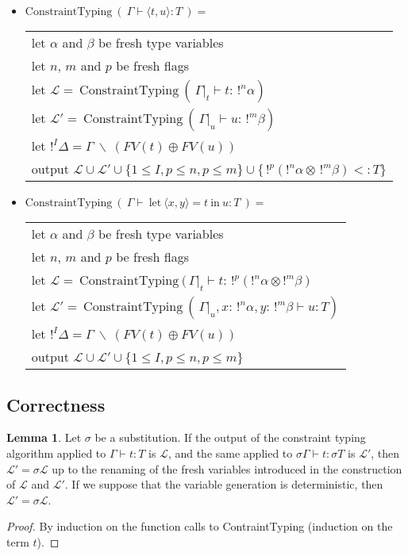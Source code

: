 \documentclass[10pt]{article}
\theoremstyle{plain}
\theoremstyle{definition}
\newtheorem{lemma}{Lemma}[section]
\newcommand{\pair}[2]{\langle #1, #2 \rangle}
\begin{document}
\begin{itemize}
		\item $\text{ConstraintTyping} ~ (~ \Gamma \vdash \pair{t}{u} : T ~) = $ \\
			\begin{tabular}{l}
				let $\alpha$ and $\beta$ be fresh type variables \\
				let $n$, $m$ and $p$ be fresh flags \\
				let $\mathcal{L} = ~ \text{ConstraintTyping} ~ ( \, \Gamma|_t \vdash t : \, !^n\alpha)$ \\
				let $\mathcal{L'} = ~ \text{ConstraintTyping} ~ ( \, \Gamma|_u \vdash u : \, !^m\beta)$ \\
				let $!^I\Delta = \Gamma ~ \backslash ~ (FV(t) \oplus FV(u))$ \\
				output $\mathcal{L \cup L'} \cup \{ 1 \le I, p \le n, p \le m \} \cup \{ \, !^p (!^n \alpha \otimes \, !^m \beta) <: T\}$
			\end{tabular}
			
		\item $\text{ConstraintTyping} ~ (~ \Gamma \vdash ~\text{let}~ \pair{x}{y} = t ~\text{in}~ u : T ~) = $ \\
			\begin{tabular}{l}
				let $\alpha$ and $\beta$ be fresh type variables \\
				let $n$, $m$ and $p$ be fresh flags \\
				let $\mathcal{L} = ~ \text{ConstraintTyping} ~ ( \, \Gamma|_t \vdash t : \, !^p(!^n \alpha \otimes !^m \beta)$ \\
				let $\mathcal{L'} = ~ \text{ConstraintTyping} ~ ( \, \Gamma|_u, x : \,!^n \alpha, y : \,!^m \beta \vdash u : T)$ \\
				let $!^I\Delta = \Gamma ~ \backslash ~ (FV(t) \oplus FV(u))$ \\
				output $\mathcal{L \cup L'} \cup \{ 1 \le I, p \le n, p \le m \}$
			\end{tabular}
	\end{itemize}
	
\subsection{Correctness}

\begin{lemma}
	\label{tau-context}
	Let $\sigma$ be a substitution. If the output of the constraint typing algorithm applied to $\Gamma \vdash t : T$ is $\mathcal{L}$,
	and the same applied to $\sigma \Gamma \vdash t : \sigma T$ is $\mathcal{L'}$,
	then $\mathcal{L'} = \sigma \mathcal{L}$ up to the renaming of the fresh variables introduced in the construction of $\mathcal{L}$ and
	$\mathcal{L'}$. If we suppose that the variable generation is deterministic, then $\mathcal{L'} = \sigma \mathcal{L}$.
	
	\begin{proof}
		By induction on the function calls to ContraintTyping (induction on the term $t$).
	\end{proof}
\end{lemma}
\end{document}
